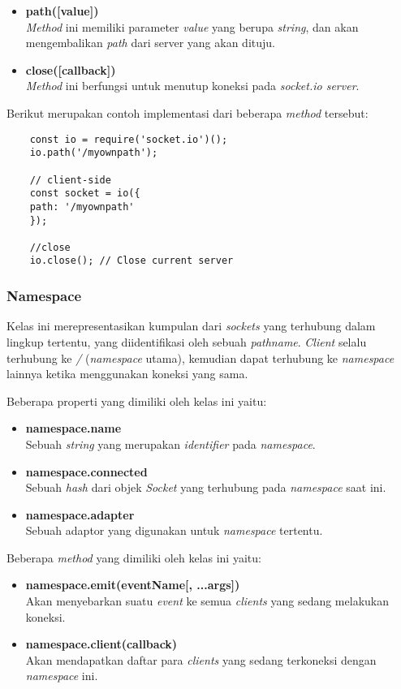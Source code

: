 \begin{itemize}
	\item \textbf{path([value])} \\ \textit{Method} ini memiliki parameter \textit{value} yang berupa \textit{string}, dan akan mengembalikan \textit{path} dari server yang akan dituju.
	\item \textbf{close([callback])} \\ \textit{Method} ini berfungsi untuk menutup koneksi pada \textit{socket.io server}. 
\end{itemize}

Berikut merupakan contoh implementasi dari beberapa \textit{method} tersebut:

\begin{lstlisting}
	const io = require('socket.io')();
	io.path('/myownpath');
	
	// client-side
	const socket = io({
	path: '/myownpath'
	});
	
	//close
	io.close(); // Close current server
\end{lstlisting}
	
\subsubsection{Namespace}
Kelas ini merepresentasikan kumpulan dari \textit{sockets} yang terhubung dalam lingkup tertentu, yang diidentifikasi oleh sebuah \textit{pathname}. \textit{Client} selalu terhubung ke \textit{/} (\textit{namespace} utama), kemudian dapat terhubung ke \textit{namespace} lainnya ketika menggunakan koneksi yang sama.

Beberapa properti yang dimiliki oleh kelas ini yaitu: 
\begin{itemize}
	\item \textbf{namespace.name} \\ Sebuah \textit{string} yang merupakan \textit{identifier} pada \textit{namespace}.
	\item \textbf{namespace.connected} \\ Sebuah \textit{hash} dari objek \textit{Socket} yang terhubung pada \textit{namespace} saat ini.
	\item \textbf{namespace.adapter} \\ Sebuah adaptor yang digunakan untuk \textit{namespace} tertentu.
\end{itemize}

Beberapa \textit{method} yang dimiliki oleh kelas ini yaitu:

\begin{itemize}
	\item \textbf{namespace.emit(eventName[, ...args])} \\ Akan menyebarkan suatu \textit{event} ke semua \textit{clients} yang sedang melakukan koneksi.
	
	\item \textbf{namespace.client(callback)} \\ Akan mendapatkan daftar para \textit{clients} yang sedang terkoneksi dengan \textit{namespace} ini.
\end{itemize}

